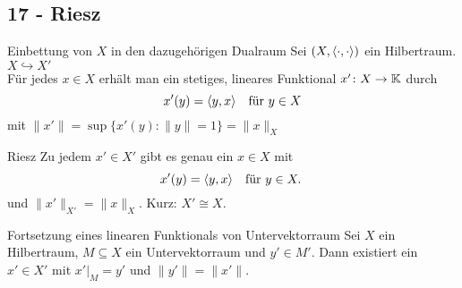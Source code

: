 \subsection*{17 - Riesz}

\begin{karte}{Einbettung von $X$ in den dazugehörigen Dualraum}
	Sei $(X, \langle \cdot, \cdot \rangle)$ ein Hilbertraum. $X \hookrightarrow X'$ \\
	Für jedes $x \in X$ erhält man ein stetiges, lineares Funktional $x' \colon X \rightarrow \mathbb{K}$ durch
		\[ x'(y) = \langle y , x \rangle \quad \text{für } y \in X \]
		mit $\| x' \| = \sup \{ x'(y) : \| y \| = 1 \} = \| x \|_{X}$
\end{karte}

\begin{karte}{Riesz}
	Zu jedem $x' \in X'$ gibt es genau ein $x \in X$ mit 
	\[ x'(y) = \< y , x \> \quad \text{für } y \in X. \]
	und $ \| x' \|_{X'} = \| x \|_{X}$. Kurz: $X' \cong X$.
\end{karte}


\begin{karte}{Fortsetzung eines linearen Funktionals von Untervektorraum}
	Sei $X$ ein Hilbertraum, $M \subseteq X$ ein Untervektorraum und $y' \in M'$. Dann existiert ein $x' \in X'$ mit $x'|_{M} = y'$ und $\| y' \| = \| x' \|$.	
\end{karte}